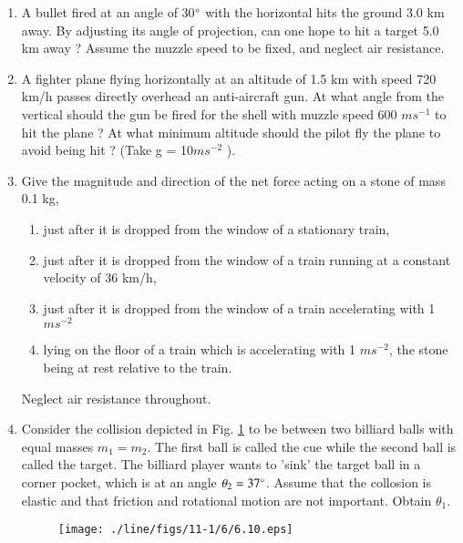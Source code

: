 \begin{enumerate}[label=\arabic*.,ref=\thesubsection.\theenumi]
\\
\solution 

\item A bullet fired at an angle of 30$\degree$ with the horizontal hits the ground 3.0 km away. By adjusting its angle of projection, can one hope to hit a target 5.0 km away ? Assume the muzzle speed to be fixed, and neglect air resistance.
\item  A fighter plane flying horizontally at an altitude of 1.5 km with speed 720 km/h passes directly overhead an anti-aircraft gun. At what angle from the vertical should the gun be fired for the shell with muzzle speed 600 $m s^{-1}$ to hit the plane ? 
At what minimum  altitude should the pilot fly the plane to avoid being hit ? (Take g = 10$ m s^{-2}$
).
\item Give the magnitude and direction of the net force acting on a stone of mass 0.1 kg, 
\begin{enumerate}
\item  just after it is dropped from the window of a stationary train, 
\item  just after it is dropped from the window of a train running at a constant velocity of 36 km/h,
\item  just after it is dropped from the window of a train accelerating with 1$ m s^{-2} $
\item  lying on the floor of a train which is accelerating with 1 $m s^{-2}$, the stone being at rest relative to the train.
\end{enumerate}
Neglect air resistance throughout. 

\item Consider the collision depicted in Fig. \ref{fig:6.10} to be between two billiard balls with equal masses $m_1= m_2$.  The first ball is called the cue while the second ball is called the target. The billiard player wants to 'sink' the target ball in a corner pocket, which is at an angle $\theta_2=37\degree$.  Assume that the collosion
is elastic and that friction and rotational motion are not important. Obtain $\theta_1$.
\begin{figure}[!ht]
\centering
\texttt{[image: ./line/figs/11-1/6/6.10.eps]}
\caption{}
\label{fig:6.10}
\end{figure}

\end{enumerate}
